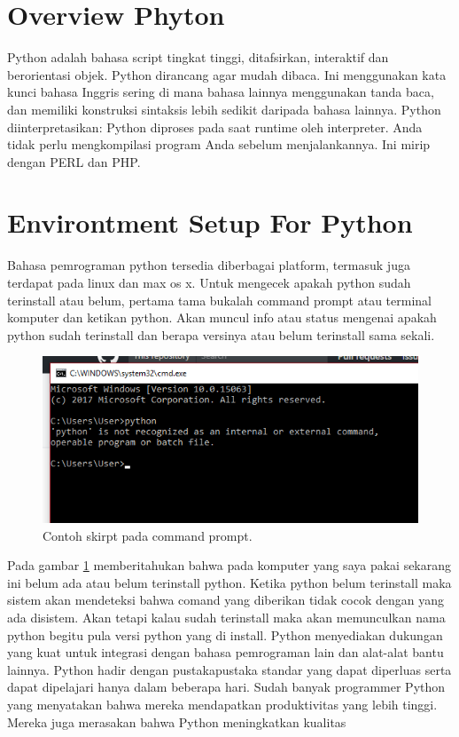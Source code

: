 \section{Overview Phyton}
Python adalah bahasa script tingkat tinggi, ditafsirkan,
interaktif dan berorientasi objek. Python dirancang agar
mudah dibaca. Ini menggunakan kata kunci bahasa Inggris
sering di mana bahasa lainnya menggunakan tanda baca,
dan memiliki konstruksi sintaksis lebih sedikit daripada
bahasa lainnya.
Python diinterpretasikan: Python diproses pada saat runtime
oleh interpreter. Anda tidak perlu mengkompilasi program
Anda sebelum menjalankannya. Ini mirip dengan PERL dan
PHP.

\section{Environtment Setup For Python}
Bahasa pemrograman python tersedia diberbagai platform, termasuk juga terdapat pada 
linux dan max os x. Untuk mengecek apakah python sudah terinstall atau belum, pertama 
tama bukalah command prompt atau terminal komputer dan ketikan python. Akan muncul info 
atau status mengenai apakah python sudah terinstall dan berapa versinya atau belum terinstall sama sekali.
  \begin{figure}[ht]
	\centerline{\includegraphics[width=1\textwidth]{Plagiarisme/cmd.PNG}}
	\caption{Contoh skirpt pada command prompt.}
	\label{cmd}
	\end{figure}
Pada gambar \ref{cmd} memberitahukan bahwa pada komputer yang saya pakai sekarang ini belum ada atau belum terinstall python.
Ketika python belum terinstall maka sistem akan mendeteksi bahwa comand yang diberikan tidak cocok dengan yang ada disistem. 
Akan tetapi kalau sudah terinstall maka akan memunculkan nama python begitu pula versi python yang di install.
Python menyediakan dukungan yang kuat untuk integrasi dengan bahasa pemrograman lain dan alat-alat bantu lainnya. 
Python hadir dengan pustakapustaka standar yang dapat diperluas serta dapat dipelajari hanya dalam beberapa hari.
Sudah banyak programmer Python yang menyatakan bahwa mereka mendapatkan produktivitas yang lebih tinggi. 
Mereka juga merasakan bahwa Python meningkatkan kualitas 

